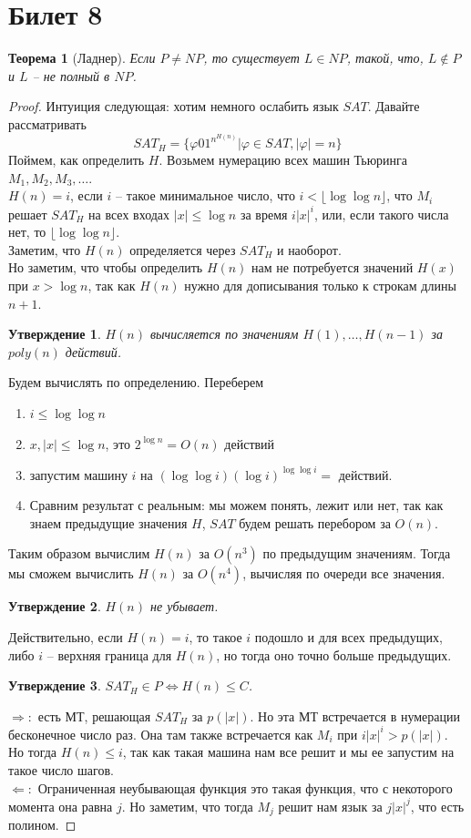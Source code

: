 \documentclass[12pt, letterpaper]{article}
\newtheorem{theorem}{Теорема}[section]
\newtheorem{prop}{Утверждение}[section]
\newcommand{\ph}{\varphi}
\begin{document}
\section{Билет 8}
\begin{theorem}[Ладнер]
Если $P \neq NP$, то существует $L \in NP$, такой, что, $L \notin P$ и $L$ -- не полный в $NP$.
\end{theorem}
\begin{proof}
Интуиция следующая: хотим немного ослабить язык $SAT$. Давайте рассматривать 
$$SAT_H = \{\ph 0 1^{n^{H(n)}} | \ph \in SAT, |\ph| = n \} $$
Поймем, как определить $H$. 
Возьмем нумерацию всех машин Тьюринга $M_1, M_2, M_3, \ldots$.\\
$H(n) = i$, если $i$ -- такое минимальное число, что $i < \lfloor \log \log n \rfloor$, что $M_i$ решает $SAT_H$ на всех входах $|x| \leq \log n$ за время $i|x|^i$, или, если такого числа нет, то $\lfloor \log \log n \rfloor$.\\
Заметим, что $H(n)$ определяется через $SAT_H$ и наоборот. \\
Но заметим, что чтобы определить $H(n)$ нам не потребуется значений $H(x)$ при $x > \log n$, так как $H(n)$ нужно для дописывания только к строкам длины $n+1$. 

\begin{prop}
$H(n)$ вычисляется по значениям $H(1), \ldots, H(n-1)$ за $poly(n)$ действий. 
\end{prop}
Будем вычислять по определению. Переберем \begin{enumerate}
\item $i \leq \log \log n$
\item $x, |x| \leq \log n$, это $2^{\log n} = O(n)$ действий
\item запустим машину $i$ на $(\log \log i) (\log i)^{\log \log i} = $ действий.
\item Сравним результат с реальным: мы можем понять, лежит или нет, так как знаем предыдущие значения $H$, $SAT$ будем решать перебором за $O(n)$.	
\end{enumerate}
Таким образом вычислим $H(n)$ за $O(n^3)$ по предыдущим значениям. Тогда мы сможем вычислить $H(n)$ за $O(n^4)$, вычисляя по очереди все значения.

\begin{prop}
$H(n)$ не убывает.
\end{prop}
Действительно, если $H(n)=i$, то такое $i$ подошло и для всех предыдущих, либо $i$ -- верхняя граница для $H(n)$, но тогда оно точно больше предыдущих.

\begin{prop}
$SAT_H \in P \Longleftrightarrow H(n) \leq C$.
\end{prop}
$\Rightarrow:$ есть МТ, решающая $SAT_H$ за $p(|x|)$. Но эта МТ встречается в нумерации бесконечное число раз. Она там также встречается как $M_i$ при $i|x|^i > p(|x|)$. Но тогда $H(n) \leq i$, так как такая машина нам все решит и мы ее запустим на такое число шагов.\\
$\Leftarrow:$ Ограниченная неубывающая функция это такая функция, что с некоторого момента она равна $j$. Но заметим, что тогда $M_j$ решит нам язык за $j|x|^j$, что есть полином.
\end{proof}
\end{document}
